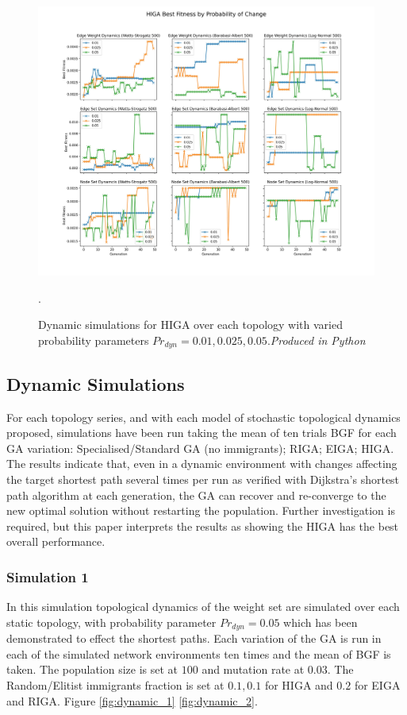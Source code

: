 \documentclass[
	a4paper, %
	10pt, %
	unnumberedsections, %
	twoside, %
]{LTJournalArticle}
\begin{document}
\begin{figure}
	\includegraphics[width=\linewidth]{Figures/sims/dynamic/prob_dyn.jpg}
	\caption{Dynamic simulations for HIGA over each topology with varied probability parameters  \(Pr_{dyn} = 0.01, 0.025, 0.05\).\emph{Produced in Python}}. 
	\label{fig:prob_dyn}
\end{figure}

\subsection{Dynamic Simulations} 

For each topology series, and with each model of stochastic topological dynamics proposed, simulations have been run taking the mean of ten trials BGF for each GA variation: Specialised/Standard GA (no immigrants); RIGA; EIGA; HIGA. The results indicate that, even in a dynamic environment with changes affecting the target shortest path several times per run as verified with Dijkstra's shortest path algorithm at each generation, the GA can recover and re-converge to the new optimal solution without restarting the population. Further investigation is required, but this paper interprets the results as showing the HIGA has the best overall performance. \\ 

\subsubsection{Simulation 1} In this simulation topological dynamics of the weight set are simulated over each static topology, with probability parameter \(Pr_{dyn} = 0.05\) which has been demonstrated to effect the shortest paths. Each variation of the GA is run in each of the simulated network environments ten times and the mean of BGF is taken. The population size is set at \(100\) and mutation rate at \(0.03\). The Random/Elitist immigrants fraction is set at \(0.1, 0.1\) for HIGA and \(0.2\) for EIGA and RIGA. Figure \ref{fig:dynamic_1} \ref{fig:dynamic_2}. 
\end{document}
